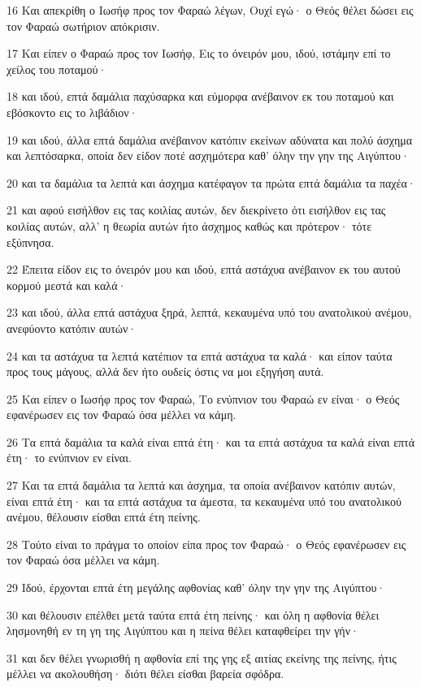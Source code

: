 \par 16 Και απεκρίθη ο Ιωσήφ προς τον Φαραώ λέγων, Ουχί εγώ· ο Θεός θέλει δώσει εις τον Φαραώ σωτήριον απόκρισιν.
\par 17 Και είπεν ο Φαραώ προς τον Ιωσήφ, Εις το όνειρόν μου, ιδού, ιστάμην επί το χείλος του ποταμού·
\par 18 και ιδού, επτά δαμάλια παχύσαρκα και εύμορφα ανέβαινον εκ του ποταμού και εβόσκοντο εις το λιβάδιον·
\par 19 και ιδού, άλλα επτά δαμάλια ανέβαινον κατόπιν εκείνων αδύνατα και πολύ άσχημα και λεπτόσαρκα, οποία δεν είδον ποτέ ασχημότερα καθ' όλην την γην της Αιγύπτου·
\par 20 και τα δαμάλια τα λεπτά και άσχημα κατέφαγον τα πρώτα επτά δαμάλια τα παχέα·
\par 21 και αφού εισήλθον εις τας κοιλίας αυτών, δεν διεκρίνετο ότι εισήλθον εις τας κοιλίας αυτών, αλλ' η θεωρία αυτών ήτο άσχημος καθώς και πρότερον· τότε εξύπνησα.
\par 22 Έπειτα είδον εις το όνειρόν μου και ιδού, επτά αστάχυα ανέβαινον εκ του αυτού κορμού μεστά και καλά·
\par 23 και ιδού, άλλα επτά αστάχυα ξηρά, λεπτά, κεκαυμένα υπό του ανατολικού ανέμου, ανεφύοντο κατόπιν αυτών·
\par 24 και τα αστάχυα τα λεπτά κατέπιον τα επτά αστάχυα τα καλά· και είπον ταύτα προς τους μάγους, αλλά δεν ήτο ουδείς όστις να μοι εξηγήση αυτά.
\par 25 Και είπεν ο Ιωσήφ προς τον Φαραώ, Το ενύπνιον του Φαραώ εν είναι· ο Θεός εφανέρωσεν εις τον Φαραώ όσα μέλλει να κάμη.
\par 26 Τα επτά δαμάλια τα καλά είναι επτά έτη· και τα επτά αστάχυα τα καλά είναι επτά έτη· το ενύπνιον εν είναι.
\par 27 Και τα επτά δαμάλια τα λεπτά και άσχημα, τα οποία ανέβαινον κατόπιν αυτών, είναι επτά έτη· και τα επτά αστάχυα τα άμεστα, τα κεκαυμένα υπό του ανατολικού ανέμου, θέλουσιν είσθαι επτά έτη πείνης.
\par 28 Τούτο είναι το πράγμα το οποίον είπα προς τον Φαραώ· ο Θεός εφανέρωσεν εις τον Φαραώ όσα μέλλει να κάμη.
\par 29 Ιδού, έρχονται επτά έτη μεγάλης αφθονίας καθ' όλην την γην της Αιγύπτου·
\par 30 και θέλουσιν επέλθει μετά ταύτα επτά έτη πείνης· και όλη η αφθονία θέλει λησμονηθή εν τη γη της Αιγύπτου και η πείνα θέλει καταφθείρει την γήν·
\par 31 και δεν θέλει γνωρισθή η αφθονία επί της γης εξ αιτίας εκείνης της πείνης, ήτις μέλλει να ακολουθήση· διότι θέλει είσθαι βαρεία σφόδρα.
